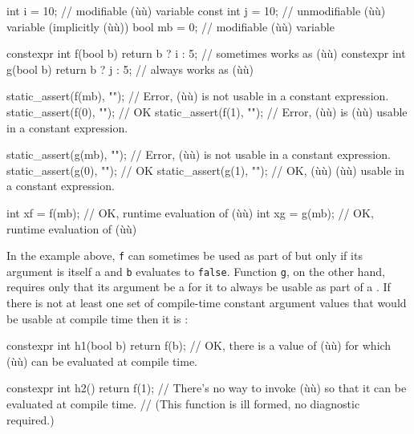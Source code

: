 \begin{emcppslisting}[emcppsbatch=e5]
      int  i = 10;  // modifiable (ù{}ù) variable
const int  j = 10;  // unmodifiable (ù{}ù) variable (implicitly (ù{}ù))
      bool mb = 0;  // modifiable (ù{}ù) variable

constexpr int f(bool b) { return b ? i : 5; }  // sometimes works as (ù{}ù)
constexpr int g(bool b) { return b ? j : 5; }  //    always works as (ù{}ù)

static_assert(f(mb), "");  // Error, (ù{}ù) is not usable in a constant expression.
static_assert(f(0),  "");  // OK
static_assert(f(1),  "");  // Error, (ù{}ù) is (ù{}ù) usable in a constant expression.

static_assert(g(mb), "");  // Error, (ù{}ù) is not usable in a constant expression.
static_assert(g(0),  "");  // OK
static_assert(g(1),  "");  // OK, (ù{}ù) (ù{}ù) usable in a constant expression.

int xf = f(mb);  // OK, runtime evaluation of (ù{}ù)
int xg = g(mb);  // OK, runtime evaluation of (ù{}ù)
\end{emcppslisting}


\noindent In the example above, \lstinline!f! can sometimes be used as part of
 but only if its argument is itself a
 and \lstinline!b! evaluates to \lstinline!false!.
Function \lstinline!g!, on the other hand, requires only that its argument
be a  for it to always be usable as part of
a . If there is not at least one set of
compile-time constant argument values that would be usable at compile
time then it is :

\begin{emcppslisting}[emcppsbatch=e5]
constexpr int h1(bool b) { return f(b); }
    // OK, there is a value of (ù{}ù) for which (ù{}ù) can be evaluated at compile time.

constexpr int h2() { return f(1); }
    // There's no way to invoke (ù{}ù) so that it can be evaluated at compile time.
    // (This function is ill formed, no diagnostic required.)
\end{emcppslisting}


